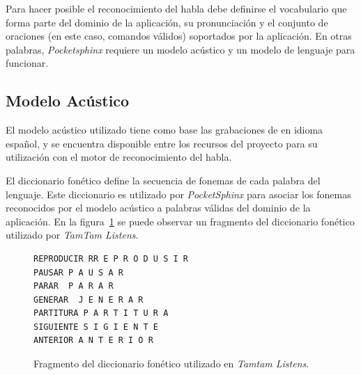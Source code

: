 Para hacer posible el reconocimiento del habla debe definirse el vocabulario que forma parte del 
dominio de la aplicaci\'on, su pronunciaci\'on y el conjunto de oraciones (en este caso, comandos 
v\'alidos) soportados por la aplicaci\'on. En otras palabras, \emph{Pocketsphinx} requiere un
modelo ac\'ustico y un modelo de lenguaje para funcionar.

\subsection{Modelo Ac\'ustico}
\label{sec:acustico-solucion}

El modelo ac\'ustico utilizado tiene como base las grabaciones de  en idioma espa\~nol,
y se encuentra disponible entre los recursos del proyecto  para su utilizaci\'on
con el motor de reconocimiento del habla.

El diccionario fon\'etico define la secuencia de fonemas de cada palabra del lenguaje.
Este diccionario es utilizado por \emph{PocketSphinx} para asociar los fonemas reconocidos por
el modelo ac\'ustico a palabras v\'alidas del dominio de la aplicaci\'on.
En la figura~\ref{figure:fragmento-dic} se puede observar un fragmento del diccionario fon\'etico
utilizado por \emph{TamTam Listens}.

\lstset{
  basicstyle=\scriptsize,        %
  breakatwhitespace=false,         %
  frame=single,                    %
  language=Octave,                 %
  numbersep=5pt,                   %
  showstringspaces=false,          %
  stepnumber=2,                    %
  tabsize=2                       %
}

\begin{figure}[H]
\begin{lstlisting}
REPRODUCIR RR E P R O D U S I R
PAUSAR P A U S A R
PARAR  P A R A R
GENERAR  J E N E R A R
PARTITURA P A R T I T U R A
SIGUIENTE S I G I E N T E
ANTERIOR A N T E R I O R
\end{lstlisting}
\caption{Fragmento del diccionario fon\'etico utilizado en \emph{Tamtam Listens}.}
\label{figure:fragmento-dic}
\end{figure}

